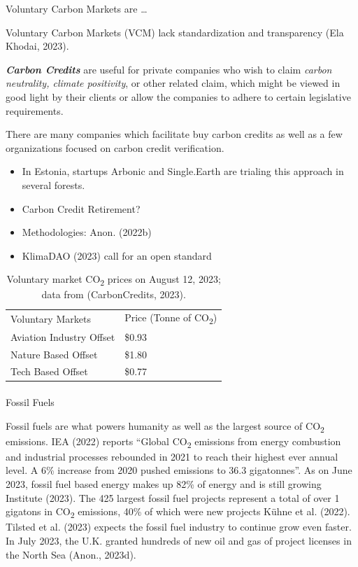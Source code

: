 \documentclass[
  letterpaper,
  DIV=11,
  numbers=noendperiod]{scrartcl}
\makeatletter
\let\oldparagraph\paragraph
\renewcommand{\paragraph}{
    \@ifstar
      \xxxParagraphStar
      \xxxParagraphNoStar
  }
\newcommand{\xxxParagraphStar}[1]{\oldparagraph*{#1}\mbox{}}
\newcommand{\xxxParagraphNoStar}[1]{\oldparagraph{#1}\mbox{}}
\providecommand{\tightlist}{%
  \setlength{\itemsep}{0pt}\setlength{\parskip}{0pt}}\usepackage{longtable,booktabs,array}
\makeatother
\begin{document}
Voluntary Carbon Markets are \ldots{}

Voluntary Carbon Markets (VCM) lack standardization and transparency
(Ela Khodai, 2023).

\textbf{\emph{Carbon Credits}} are useful for private companies who wish
to claim \emph{carbon neutrality, climate positivity}, or other related
claim, which might be viewed in good light by their clients or allow the
companies to adhere to certain legislative requirements.

There are many companies which facilitate buy carbon credits as well as
a few organizations focused on carbon credit verification.

\begin{itemize}
\tightlist
\item
  In Estonia, startups Arbonic and Single.Earth are trialing this
  approach in several forests.
\item
  Carbon Credit Retirement?
\item
  Methodologies: Anon. (2022b)
\item
  KlimaDAO (2023) call for an open standard
\end{itemize}

\begin{longtable}[]{@{}ll@{}}
\caption{Voluntary market CO\textsubscript{2} prices on August 12, 2023;
data from (CarbonCredits, 2023).}\tabularnewline
\toprule\noalign{}
\endfirsthead
\endhead
\bottomrule\noalign{}
\endlastfoot
Voluntary Markets & Price (Tonne of CO\textsubscript{2}) \\
Aviation Industry Offset & \$0.93 \\
Nature Based Offset & \$1.80 \\
Tech Based Offset & \$0.77 \\
\end{longtable}

\paragraph{Fossil Fuels}\label{fossil-fuels}

Fossil fuels are what powers humanity as well as the largest source of
CO\textsubscript{2} emissions. IEA (2022) reports ``Global
CO\textsubscript{2} emissions from energy combustion and industrial
processes rebounded in 2021 to reach their highest ever annual level. A
6\% increase from 2020 pushed emissions to 36.3 gigatonnes''. As on June
2023, fossil fuel based energy makes up 82\% of energy and is still
growing Institute (2023). The 425 largest fossil fuel projects represent
a total of over 1 gigatons in CO\textsubscript{2} emissions, 40\% of
which were new projects Kühne et al. (2022). Tilsted et al. (2023)
expects the fossil fuel industry to continue grow even faster. In July
2023, the U.K. granted hundreds of new oil and gas of project licenses
in the North Sea (Anon., 2023d).
\end{document}
